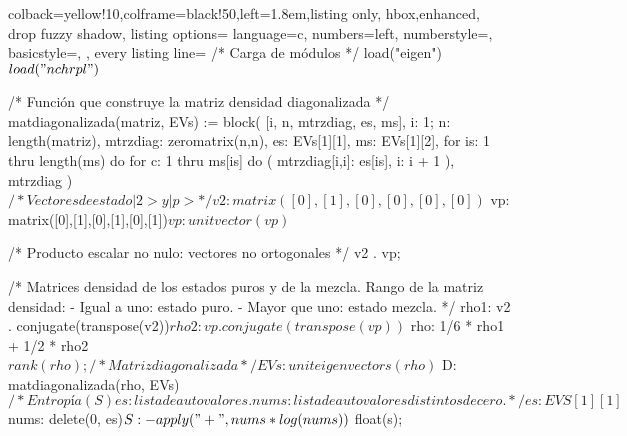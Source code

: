 \vbox{
}
\begin{tcblisting}{%
   colback=yellow!10,colframe=black!50,left=1.8em,listing only,
   hbox,enhanced, drop fuzzy shadow,
   listing options={%
     language=c,
     numbers=left,
     numberstyle=\scriptsize\color{red!50},
     basicstyle=\footnotesize,
   },
   every listing line={\ttfamily}
 }
 /* Carga de módulos */
 load("eigen")$ load("nchrpl")$

 /* Función que construye la matriz densidad diagonalizada */
 matdiagonalizada(matriz, EVs) := block(
    [i, n, mtrzdiag, es, ms],
    i: 1; n: length(matriz), mtrzdiag: zeromatrix(n,n),
    es: EVs[1][1], ms: EVs[1][2],
    for is: 1 thru length(ms) do
       for c: 1 thru ms[is] do (
          mtrzdiag[i,i]: es[is], i: i + 1
       ),
       mtrzdiag
 )$
 
 /* Vectores de estado |2> y |p> */
 v2: matrix([0],[1],[0],[0],[0],[0])$
 vp: matrix([0],[1],[0],[1],[0],[1])$
 vp: unitvector(vp)$

 /* Producto escalar no nulo: vectores no ortogonales */
 v2 . vp;

 /* Matrices densidad de los estados puros y de la mezcla.
    Rango de la matriz densidad:
      - Igual a uno:   estado puro.
      - Mayor que uno: estado mezcla. */
 rho1: v2 . conjugate(transpose(v2))$
 rho2: vp . conjugate(transpose(vp))$
 rho: 1/6 * rho1 + 1/2 * rho2$ rank(rho);

 /* Matriz diagonalizada */
 EVs: uniteigenvectors(rho)$
 D: matdiagonalizada(rho, EVs)$
 
 /* Entropía (S)
    es:   lista de autovalores.
    nums: lista de autovalores distintos de cero. */
 es: EVS[1][1]$
 nums: delete(0, es)$
 S: - apply("+", nums * log(nums))$
 float(s);
\end{tcblisting}

